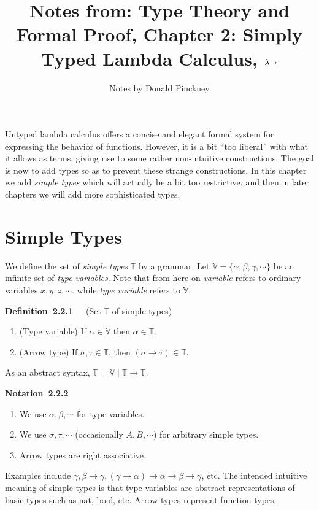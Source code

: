 \documentclass[letterpaper]{article}
\author{Notes by Donald Pinckney}
\title{Notes from: Type Theory and Formal Proof, Chapter 2: Simply Typed Lambda Calculus, $\lambda \!\! \rightarrow$}
\newenvironment{notation}[2][]{\par\medskip
	\noindent \textbf{Notation~#2}~~~#1 \rmfamily\em}{\medskip}
\newenvironment{definition}[2][]{\par\medskip
	\noindent \textbf{Definition~#2}~~~#1 \rmfamily}{\medskip}
\newcommand{\T}{\mathbb{T}}
\newcommand{\V}{\mathbb{V}}
\begin{document}
\maketitle

Untyped lambda calculus offers a concise and elegant formal system for expressing the behavior of functions. However, it is a bit ``too liberal'' with what it allows as terms, giving rise to some rather non-intuitive constructions. The goal is now to add types so as to prevent these strange constructions. In this chapter we add \emph{simple types} which will actually be a bit too restrictive, and then in later chapters we will add more sophisticated types.

\section{Simple Types}

We define the set of \emph{simple types} $\T$ by a grammar. Let $\V = \{\alpha, \beta, \gamma, \cdots \}$ be an infinite set of \emph{type variables}. Note that from here on \emph{variable} refers to ordinary variables $x, y, z, \cdots$. while \emph{type variable} refers to $\V$.

\begin{definition}[(Set $\T$ of simple types)]{2.2.1}
	\begin{enumerate}
		\item (Type variable) If $\alpha \in \V$ then $\alpha \in \T$.
		\item (Arrow type) If $\sigma, \tau \in \T$, then $(\sigma \to \tau) \in \T$.
	\end{enumerate}
As an abstract syntax, $\T = \V \mid \T \to \T$.
\end{definition}

\begin{notation}{2.2.2}
	\begin{enumerate}
		\item We use $\alpha, \beta, \cdots$ for type variables.
		\item We use $\sigma, \tau, \cdots$ (occasionally $A, B, \cdots$) for arbitrary simple types.
		\item Arrow types are right associative.
	\end{enumerate}
\end{notation}

Examples include $\gamma, \beta \to \gamma, (\gamma \to \alpha) \to \alpha \to \beta \to \gamma$, etc. The intended intuitive meaning of simple types is that type variables are abstract representations of basic types such as nat, bool, etc. Arrow types represent function types.
\end{document}

